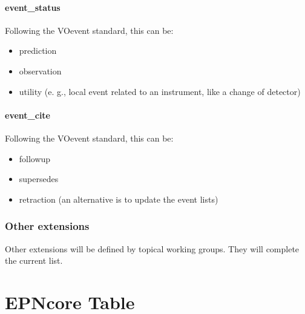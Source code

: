 \documentclass[11pt,a4paper]{ivoa}
\begin{document}
\paragraph{event\_status}

Following the VOevent standard, this can be:

\begin{itemize}

\item prediction

\item observation

\item utility (e. g., local event related to an instrument, like a change of detector)

\end{itemize}

\paragraph{event\_cite}

Following the VOevent standard, this can be:

\begin{itemize}

\item followup

\item supersedes

\item retraction (an alternative is to update the event lists)

\end{itemize}

\subsubsection{Other extensions\\}

Other extensions will be defined by topical working groups. They will complete the current list.





\section{EPNcore Table}
\end{document}
